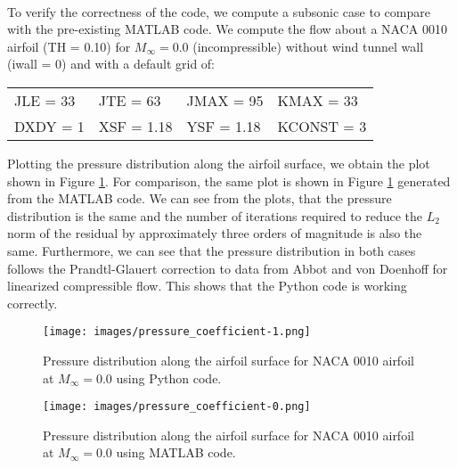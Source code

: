 \\

To verify the correctness of the code, we compute a subsonic case to compare with the pre-existing MATLAB code. We compute the flow about a NACA 0010 airfoil (TH = 0.10) for $M_\infty = 0.0$ (incompressible) without wind tunnel wall (iwall = 0) and with a default grid of:

\begin{center}
\begin{tabular}{@{} l l l l @{}}
    JLE = 33  & JTE = 63  & JMAX = 95  & KMAX = 33 \\
    DXDY = 1  & XSF = 1.18  & YSF = 1.18  & KCONST = 3
\end{tabular}    
\end{center}

Plotting the pressure distribution along the airfoil surface, we obtain the plot shown in Figure \ref{fig:pressure_coefficient-1}. For comparison, the same plot is shown in Figure \ref{fig:pressure_coefficient-1} generated from the MATLAB code.  We can see from the plots, that the pressure distribution is the same and the number of iterations required to reduce the $L_2$ norm of the residual by approximately three orders of magnitude is also the same. Furthermore, we can see that the pressure distribution in both cases follows the Prandtl-Glauert correction to data from Abbot and von Doenhoff for linearized compressible flow. This shows that the Python code is working correctly.

\begin{figure}
    \centering
    \texttt{[image: images/pressure\_coefficient-1.png]}
    \caption{Pressure distribution along the airfoil surface for NACA 0010 airfoil at $M_\infty = 0.0$ using Python code.}
    \label{fig:pressure_coefficient-1}
\end{figure}

\begin{figure}
    \centering
    \texttt{[image: images/pressure\_coefficient-0.png]}
    \caption{Pressure distribution along the airfoil surface for NACA 0010 airfoil at $M_\infty = 0.0$ using MATLAB code.}
    \label{fig:pressure_coefficient-0}
\end{figure}

